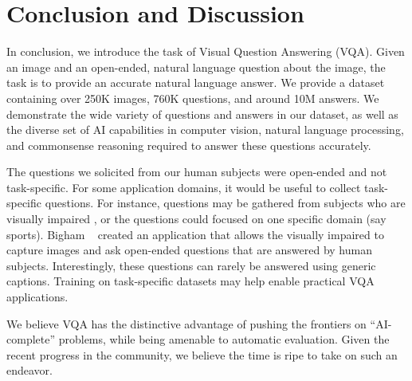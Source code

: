 \section{Conclusion and Discussion}

In conclusion, we introduce the task of Visual Question Answering (VQA). Given an image and an open-ended, natural language question about the image, the task is to provide an accurate natural language answer. We provide a dataset containing over 250K images, 760K questions, and around 10M answers. We demonstrate the wide variety of questions and answers in our dataset, as well as the diverse set of AI capabilities in computer vision, natural language processing, and commonsense reasoning required to answer these questions accurately.

The questions we solicited from our human subjects were open-ended and not task-specific. For some application domains, it would be useful to collect task-specific questions. For instance, questions may be gathered from subjects who are visually impaired \cite{vizwiz}, or the questions could focused on one specific domain (say sports). 
Bigham \etal~\cite{vizwiz} created an application that allows the visually impaired to capture images and ask open-ended questions that are answered by human subjects. Interestingly, these questions can rarely be answered using generic captions. Training on task-specific datasets may help enable practical VQA applications.

We believe VQA has the distinctive advantage of pushing the frontiers on ``AI-complete'' problems, while being amenable to automatic evaluation. Given the recent progress in the community, we believe the time is ripe to take on such an endeavor. 

